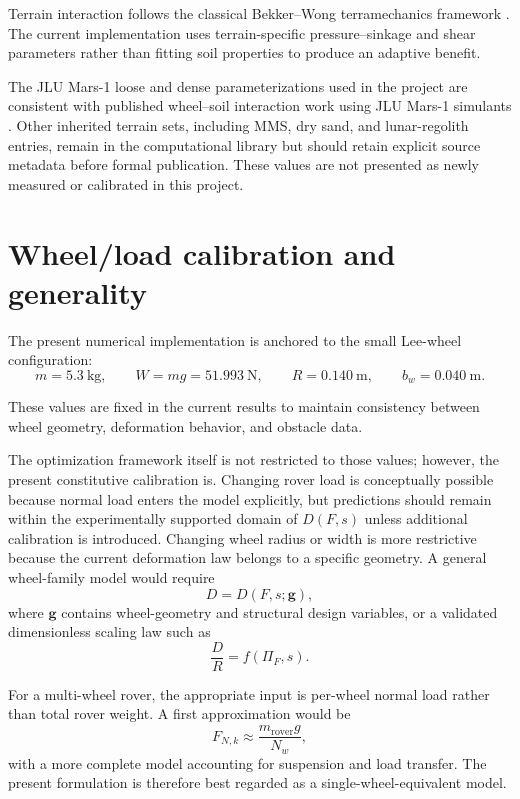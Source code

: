 \documentclass[11pt]{article}
\begin{document}
Terrain interaction follows the classical Bekker--Wong terramechanics framework \cite{Bekker1969,Wong2001,Wong2010}. The current implementation uses terrain-specific pressure--sinkage and shear parameters rather than fitting soil properties to produce an adaptive benefit.

The JLU Mars-1 loose and dense parameterizations used in the project are consistent with published wheel--soil interaction work using JLU Mars-1 simulants \cite{Shen2024}. Other inherited terrain sets, including MMS, dry sand, and lunar-regolith entries, remain in the computational library but should retain explicit source metadata before formal publication. These values are not presented as newly measured or calibrated in this project.

\section{Wheel/load calibration and generality}

The present numerical implementation is anchored to the small Lee-wheel configuration:
\begin{equation}
m=5.3~\mathrm{kg},\qquad
W=mg=51.993~\mathrm{N},\qquad
R=0.140~\mathrm{m},\qquad
b_w=0.040~\mathrm{m}.
\end{equation}

These values are fixed in the current results to maintain consistency between wheel geometry, deformation behavior, and obstacle data.

The optimization framework itself is not restricted to those values; however, the present constitutive calibration is. Changing rover load is conceptually possible because normal load enters the model explicitly, but predictions should remain within the experimentally supported domain of $D(F,s)$ unless additional calibration is introduced. Changing wheel radius or width is more restrictive because the current deformation law belongs to a specific geometry. A general wheel-family model would require
\begin{equation}
D=D(F,s;\mathbf{g}),
\end{equation}
where $\mathbf{g}$ contains wheel-geometry and structural design variables, or a validated dimensionless scaling law such as
\begin{equation}
\frac{D}{R}=f(\Pi_F,s).
\end{equation}

For a multi-wheel rover, the appropriate input is per-wheel normal load rather than total rover weight. A first approximation would be
\begin{equation}
F_{N,k}\approx\frac{m_{\mathrm{rover}}g}{N_w},
\end{equation}
with a more complete model accounting for suspension and load transfer. The present formulation is therefore best regarded as a single-wheel-equivalent model.
\end{document}

